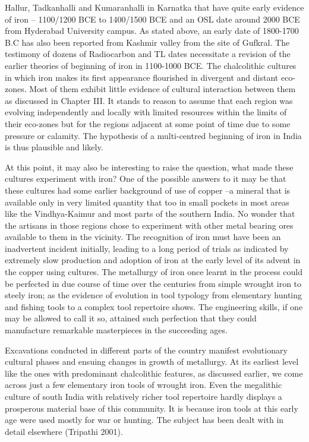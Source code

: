 Hallur, Tadkanhalli and Kumaranhalli in Karnatka that have quite early evidence of iron – 1100/1200 BCE to 1400/1500 BCE and an OSL date around 2000 BCE from Hyderabad University campus. As stated above, an early date of 1800-1700 B.C has also been reported from Kashmir valley from the site of Gufkral. The testimony of dozens of Radiocarbon and TL dates necessitate a revision of the earlier theories of beginning of iron in 1100-1000 BCE.  The chalcolithic cultures in which iron makes its first appearance flourished in divergent and distant eco-zones. Most of them exhibit little evidence of cultural interaction between them as discussed in Chapter III. It stands to reason to assume that each region was evolving independently and locally with limited resources within the limits of their eco-zones but for the regions adjacent at some point of time due to some pressure or calamity. The hypothesis of a multi-centred beginning of iron in India is thus plausible and likely.  

At this point, it may also be interesting to raise the question, what made these cultures experiment with iron? One of the possible answers to it may be that these cultures had some earlier background of use of copper –a mineral that is available only in very limited quantity that too in small pockets in most areas like the Vindhya-Kaimur and most parts of the southern India. No wonder that the artisans in those regions chose to experiment with other metal bearing ores available to them in the vicinity. The recognition of iron must have been an inadvertent incident initially, leading to a long period of trials as indicated by extremely slow production and adoption of iron at the early level of its advent in the copper using cultures. The metallurgy of iron once learnt in the process could be perfected in due course of time over the centuries from simple wrought iron to steely iron; as the evidence of evolution in tool typology from elementary hunting and fishing tools to a complex tool repertoire shows. The engineering skills, if one may be allowed to call it so, attained such perfection that they could manufacture remarkable masterpieces in the succeeding ages. 

Excavations conducted in different parts of the country manifest evolutionary cultural phases and ensuing changes in growth of metallurgy. At its earliest level like the ones with predominant chalcolithic features, as discussed earlier, we come across just a few elementary iron tools of wrought iron. Even the megalithic culture of south India with relatively richer tool repertoire hardly displays a prosperous material base of this community. It is because iron tools at this early age were used mostly for war or hunting. The subject has been dealt with in detail elsewhere (Tripathi 2001).

